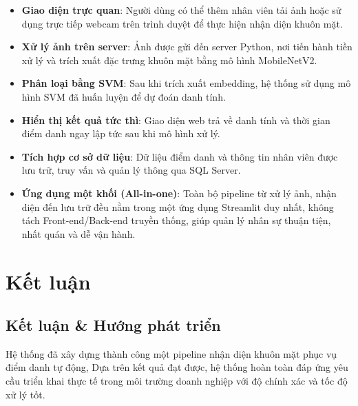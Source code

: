 \documentclass[a4paper]{book}
\begin{document}
\begin{itemize}
    \item \textbf{Giao diện trực quan}: Người dùng có thể thêm nhân viên tải ảnh hoặc sử dụng trực tiếp webcam trên trình duyệt để thực hiện nhận diện khuôn mặt.
    
    \item \textbf{Xử lý ảnh trên server}: Ảnh được gửi đến server Python, nơi tiến hành tiền xử lý và trích xuất đặc trưng khuôn mặt bằng mô hình MobileNetV2.
    
    \item \textbf{Phân loại bằng SVM}: Sau khi trích xuất embedding, hệ thống sử dụng mô hình SVM đã huấn luyện để dự đoán danh tính.
    
    \item \textbf{Hiển thị kết quả tức thì}: Giao diện web trả về danh tính và thời gian điểm danh ngay lập tức sau khi mô hình xử lý.
    
    \item \textbf{Tích hợp cơ sở dữ liệu}: Dữ liệu điểm danh và thông tin nhân viên được lưu trữ, truy vấn và quản lý thông qua SQL Server.
    
    \item \textbf{Ứng dụng một khối (All-in-one)}: Toàn bộ pipeline từ xử lý ảnh, nhận diện đến lưu trữ đều nằm trong một ứng dụng Streamlit duy nhất, không tách Front-end/Back-end truyền thống, giúp quản lý nhân sự thuận tiện, nhất quán và dễ vận hành.
\end{itemize}



\chapter{Kết luận}

\section{Kết luận \& Hướng phát triển}

Hệ thống đã xây dựng thành công một pipeline nhận diện khuôn mặt phục vụ điểm danh tự động, 
Dựa trên kết quả đạt được, hệ thống hoàn toàn đáp ứng yêu cầu triển khai thực tế trong môi trường doanh nghiệp với độ chính xác và tốc độ xử lý tốt.
\end{document}
